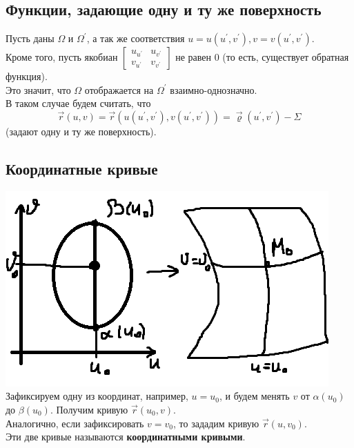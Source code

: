 \documentclass[12pt]{article}
\begin{document}
\subsection{Функции, задающие одну и ту же поверхность}
Пусть даны $\Omega$ и $\Omega^{'}$, а так же соответствия $u=u(u^{'},v^{'}), v=v(u^{'},v^{'})$.\\
Кроме того, пусть якобиан $\begin{bmatrix} u_{u^{'}} & u_{v^{'}} \\ v_{u^{'}} & v_{v^{'}} \end{bmatrix}$ не равен 0 (то есть, существует обратная функция).\\
Это значит, что $\Omega$ отображается на $\Omega^{'}$ взаимно-однозначно.\\
В таком случае будем считать, что\\
$$\overrightarrow{r}(u,v) = \overrightarrow{r}(u(u^{'},v^{'}),v(u^{'},v^{'}))=\overrightarrow{\varrho}(u^{'},v^{'}) - \Sigma$$
(задают одну и ту же поверхность).\\
\subsection{Координатные кривые}
\includegraphics{coordCurves}\\
Зафиксируем одну из координат, например, $u=u_0$, и будем менять $v$ от $\alpha(u_0)$ до $\beta(u_0)$. Получим кривую $\overrightarrow{r}(u_0,v)$.\\
Аналогично, если зафиксировать $v=v_0$, то зададим кривую $\overrightarrow{r}(u,v_0)$.\\
Эти две кривые называются \textbf{координатными кривыми}.\\
\end{document}
